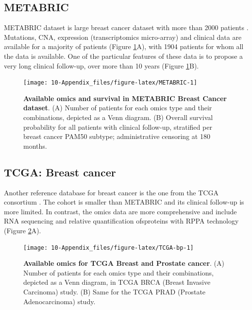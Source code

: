 \documentclass[a4paper,12pt,twoside,onecolumn,openright,final,oldfontcommands]{memoir}
\begin{document}
\subsection{METABRIC}\label{metabric}

METABRIC dataset is large breast cancer dataset with more than 2000
patients \citep{pereira2016somatic}. Mutations, CNA, expression
(transcriptomics micro-array) and clinical data are available for a
majority of patients (Figure \ref{fig:METABRIC}A), with 1904 patients
for whom all the data is available. One of the particular features of
these data is to propose a very long clinical follow-up, over more than
10 years (Figure \ref{fig:METABRIC}B).

\begin{figure}

{\centering \texttt{[image: 10-Appendix\_files/figure-latex/METABRIC-1]} 

}

\caption[Available omics and survival in METABRIC Breast Cancer dataset]{\textbf{Available omics and survival in METABRIC
Breast Cancer dataset}. (A) Number of patients for each omics type and
their combinations, depicted as a Venn diagram. (B) Overall survival
probability for all patients with clinical follow-up, stratified per
breast cancer PAM50 subtype; administrative censoring at 180 months.}\label{fig:METABRIC}
\end{figure}







\subsection{TCGA: Breast cancer}\label{tcga-breast-cancer}

Another reference database for breast cancer is the one from the TCGA
consortium \citep{cancer2012comprehensive}. The cohort is smaller than
METABRIC and its clinical follow-up is more limited. In contrast, the
omics data are more comprehensive and include RNA sequencing and
relative quantification ofsproteins with RPPA technology (Figure
\ref{fig:TCGA-bp}A).

\begin{figure}

{\centering \texttt{[image: 10-Appendix\_files/figure-latex/TCGA-bp-1]} 

}

\caption[Available omics and survival in METABRIC Breast Cancer dataset]{\textbf{Available omics for TCGA Breast and
Prostate cancer}. (A) Number of patients for each omics type and their
combinations, depicted as a Venn diagram, in TCGA BRCA (Breast Invasive
Carcinoma) study. (B) Same for the TCGA PRAD (Prostate Adenocarcinoma)
study.}\label{fig:TCGA-bp}
\end{figure}
\end{document}
